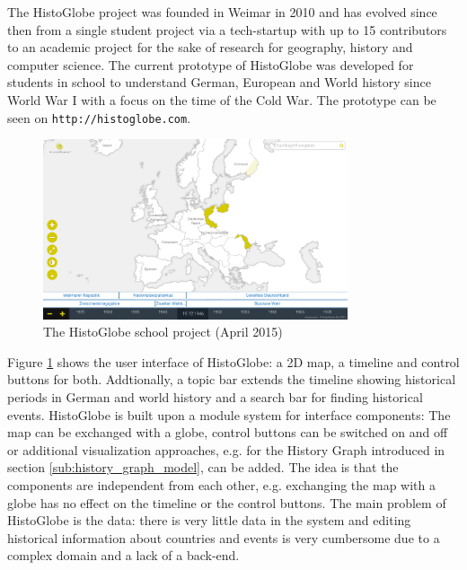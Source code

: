 The HistoGlobe project was founded in Weimar in 2010 and has evolved since then from a single student project via a tech-startup with up to 15 contributors to an academic project for the sake of research for geography, history and computer science. The current prototype of HistoGlobe was developed for students in school to understand German, European and World history since World War I with a focus on the time of the Cold War. The prototype can be seen on \texttt{http://histoglobe.com}.

\begin{figure}[ht]
  \vspace{1em}
  \centering
  \includegraphics[width=0.8\textwidth]{graphics/basics/histoglobe/school_project}
  \caption{The HistoGlobe school project (April 2015)}
  \label{fig:histoglobe_school}
\end{figure}

Figure \ref{fig:histoglobe_school} shows the user interface of HistoGlobe: a 2D map, a timeline and control buttons for both. Addtionally, a topic bar extends the timeline showing historical periods in German and world history and a search bar for finding historical events. HistoGlobe is built upon a module system for interface components: The map can be exchanged with a globe, control buttons can be switched on and off or additional visualization approaches, e.g. for the History Graph introduced in section \ref{sub:history_graph_model}, can be added. The idea is that the components are independent from each other, e.g. exchanging the map with a globe has no effect on the timeline or the control buttons. The main problem of HistoGlobe is the data: there is very little data in the system and editing historical information about countries and events is very cumbersome due to a complex domain and a lack of a back-end.


\vspace{1.5em}

